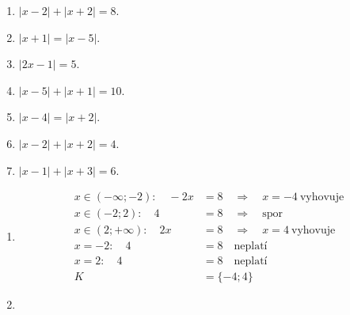 \documentclass[11pt,a4paper]{article}
\begin{document}
\begin{zadaniReseniBox}[title={Domácí úkol}]
\begin{enumerate}[label=\alph*),itemsep=2pt]
\item $|x-2|+|x+2|=8$.
\item $|x+1|=|x-5|$.
\item $|2x-1|=5$.
\item $|x-5|+|x+1|=10$.
\item $|x-4|=|x+2|$.
\item $|x-2|+|x+2|=4$.
\item $|x-1|+|x+3|=6$.
\end{enumerate}
\tcblower
\begin{enumerate}[label=\alph*),itemsep=1pt]
\item
\begin{center}
\begingroup\footnotesize
\renewcommand{\arraystretch}{1.32}
\endgroup
\end{center}
\[\begin{aligned}x\in (-\infty;-2):\quad - 2 x &= 8\quad\Longrightarrow\quad x=-4\ \text{vyhovuje}\\[2pt]
x\in (-2;2):\quad 4 &= 8\quad\Longrightarrow\quad \text{spor}\\[2pt]
x\in (2;+\infty):\quad 2 x &= 8\quad\Longrightarrow\quad x=4\ \text{vyhovuje}\\[2pt]
x=-2:\quad 4 &= 8\quad\text{neplatí}\\[2pt]
x=2:\quad 4 &= 8\quad\text{neplatí}\\[2pt]
K&=\{-4;4\}\end{aligned}\]
\item
\begin{center}
\begingroup\footnotesize
\renewcommand{\arraystretch}{1.32}
\end{center}
\end{enumerate}
\end{zadaniReseniBox}
\end{document}
